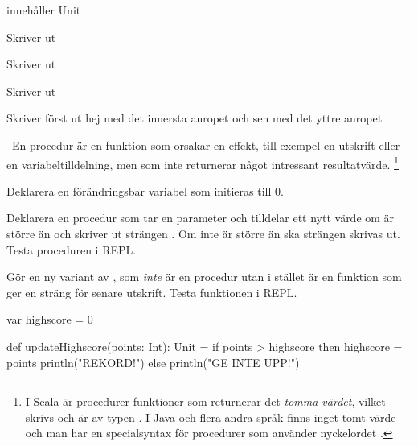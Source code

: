 \SubtaskSolved {}

\SubtaskSolved

  innehåller Unit

 Skriver ut 

 Skriver ut 

 Skriver ut 

 Skriver först ut hej med det innersta anropet och sen \code{()} med det yttre anropet

\SubtaskSolved  {}

\SubtaskSolved  {}

\QUESTEND




\QUESTBEGIN

\Task \what~En procedur är en funktion som orsakar en effekt, till exempel en utskrift eller en variabeltilldelning, men som inte returnerar något intressant resultatvärde.%
\footnote{I Scala är procedurer funktioner som returnerar det \emph{tomma värdet}, vilket skrivs \code{()} och är av typen . I Java och flera andra språk finns inget tomt värde och man har en specialsyntax för procedurer som använder nyckelordet . }

\Subtask Deklarera en förändringsbar variabel  som initieras till 0.

\Subtask Deklarera en procedur  som tar en parameter  och tilldelar  ett nytt värde om  är större än  och skriver ut strängen . Om inte  är större än  ska strängen  skrivas ut. Testa proceduren i REPL.

\Subtask Gör en ny variant av , som \emph{inte} är en procedur utan i stället är en funktion som ger en sträng för senare utskrift. Testa funktionen i REPL.

\SOLUTION

\TaskSolved \what

\SubtaskSolved
\begin{Code}
var highscore = 0
\end{Code}

\SubtaskSolved
\begin{Code}
def updateHighscore(points: Int): Unit =
  if points > highscore then
    highscore = points
    println("REKORD!")
  else println("GE INTE UPP!")
\end{Code}

